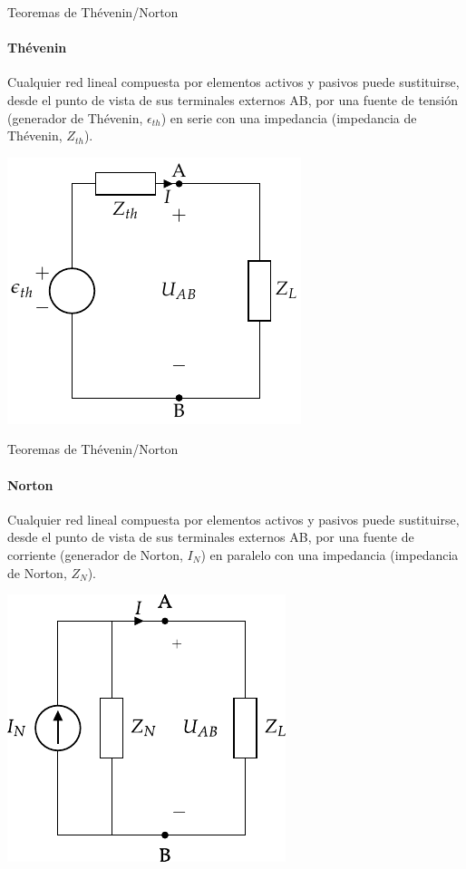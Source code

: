 \documentclass[aspectratio=169, usenames,svgnames,dvipsnames]{beamer}
\begin{document}
\begin{frame}[label={sec:org8dd90ba}]{Teoremas de Thévenin/Norton}
\framesubtitle{Thévenin}

Cualquier \alert{red lineal} compuesta por elementos activos y pasivos puede sustituirse, desde el punto de vista de sus terminales externos AB, por una \alert{fuente de tensión} (generador de Thévenin, \(\epsilon_{th}\)) en \alert{serie} con una impedancia (impedancia de Thévenin, \(Z_{th}\)).

\begin{center}
\includegraphics[height=0.6\textheight]{../figs/EquivalenteThevenin0.pdf}
\end{center}
\end{frame}

\begin{frame}[label={sec:orgb6a442c}]{Teoremas de Thévenin/Norton}
\framesubtitle{Norton}
Cualquier \alert{red lineal} compuesta por elementos activos y pasivos puede sustituirse, desde el punto de vista de sus terminales externos AB, por una \alert{fuente de corriente} (generador de Norton, \(I_N\)) en \alert{paralelo} con una impedancia (impedancia de Norton, \(Z_N\)).

\begin{center}
\includegraphics[height=0.6\textheight]{../figs/EquivalenteNorton.pdf}
\end{center}
\end{frame}
\end{document}
